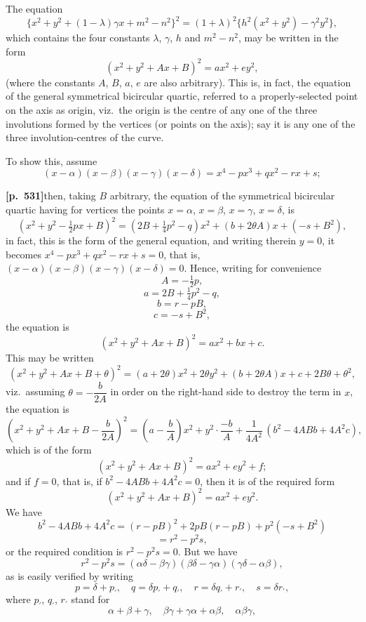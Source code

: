 \documentclass[11pt,a4paper]{article}
\begin{document}
The equation
\[
\{x^{2} + y^{2} + (1 - \lambda)\gamma x + m^{2} - n^{2}\}^{2} = (1 + \lambda)^{2}\{h^{2}(x^{2} + y^{2}) - \gamma^{2} y^{2}\},
\]
which contains the four constants $\lambda$, $\gamma$, $h$ and $m^{2} - n^{2}$, may be written in the form
\[
(x^{2} + y^{2} + Ax + B)^{2} = a x^{2} + e y^{2},
\]
(where the constants $A$, $B$, $a$, $e$ are also arbitrary). This is, in fact, the equation of the general symmetrical bicircular quartic, referred to a properly-selected point on the axis as origin, viz.\ the origin is the centre of any one of the three involutions formed by the vertices (or points on the axis); say it is any one of the three involution-centres of the curve.

To show this, assume
\[
(x - \alpha)(x - \beta)(x - \gamma)(x - \delta) = x^{4} - p x^{3} + q x^{2} - r x + s;
\]

\bigskip

\noindent\textbf{[p.~531]}\quad then, taking $B$ arbitrary, the equation of the symmetrical bicircular quartic having for vertices the points $x = \alpha$, $x = \beta$, $x = \gamma$, $x = \delta$, is
\[
(x^{2} + y^{2} - \tfrac{1}{2}p x + B)^{2} = (2B + \tfrac{1}{4}p^{2} - q) x^{2} + (b + 2\theta A) x + (-s + B^{2}),
\]
in fact, this is the form of the general equation, and writing therein $y = 0$, it becomes $x^{4} - p x^{3} + q x^{2} - r x + s = 0$, that is, $(x - \alpha)(x - \beta)(x - \gamma)(x - \delta) = 0$. Hence, writing for convenience
\[
A = -\tfrac{1}{2}p,
\]
\[
a = 2B + \tfrac{1}{4}p^{2} - q,
\]
\[
b = r - pB,
\]
\[
c = -s + B^{2},
\]
the equation is
\[
(x^{2} + y^{2} + Ax + B)^{2} = a x^{2} + b x + c.
\]
This may be written
\[
(x^{2} + y^{2} + Ax + B + \theta)^{2} = (a + 2\theta) x^{2} + 2\theta y^{2} + (b + 2\theta A) x + c + 2 B \theta + \theta^{2},
\]
viz.\ assuming $\theta = -\dfrac{b}{2A}$ in order on the right-hand side to destroy the term in $x$, the equation is
\[
\left( x^{2} + y^{2} + Ax + B - \frac{b}{2A} \right)^{2} = \left( a - \frac{b}{A} \right) x^{2} + y^{2} \cdot \frac{-b}{A} + \frac{1}{4A^{2}}\,(b^{2} - 4ABb + 4A^{2}c),
\]
which is of the form
\[
(x^{2} + y^{2} + Ax + B)^{2} = a x^{2} + e y^{2} + f;
\]
and if $f = 0$, that is, if $b^{2} - 4ABb + 4A^{2} c = 0$, then it is of the required form
\[
(x^{2} + y^{2} + Ax + B)^{2} = a x^{2} + e y^{2}.
\]
We have
\[
b^{2} - 4ABb + 4A^{2}c = (r - pB)^{2} + 2pB(r - pB) + p^{2}(-s + B^{2})
\]
\[
= r^{2} - p^{2} s,
\]
or the required condition is $r^{2} - p^{2} s = 0$. But we have
\[
r^{2} - p^{2} s = (\alpha\delta - \beta\gamma)(\beta\delta - \gamma\alpha)(\gamma\delta - \alpha\beta),
\]
as is easily verified by writing
\[
p = \delta + p_{\prime},\quad q = \delta p_{\prime} + q_{\prime},\quad r = \delta q_{\prime} + r_{\prime},\quad s = \delta r_{\prime},
\]
where $p_{\prime}$, $q_{\prime}$, $r_{\prime}$ stand for
\[
\alpha + \beta + \gamma,\quad \beta\gamma + \gamma\alpha + \alpha\beta,\quad \alpha\beta\gamma,
\]
\end{document}

